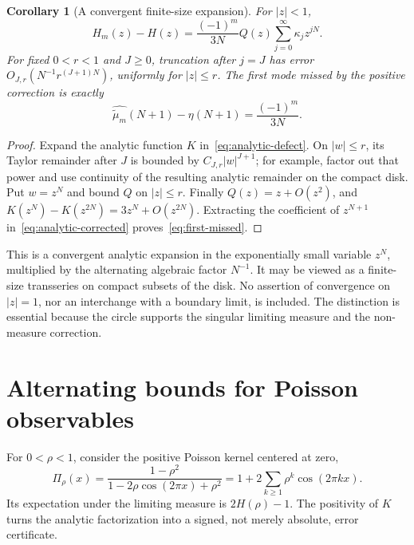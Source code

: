 \documentclass[11pt,a4paper]{article}
\numberwithin{equation}{section}
\newtheorem{corollary}[theorem]{Corollary}
\theoremstyle{definition}
\theoremstyle{remark}
\newcommand{\mt}{\widetilde\mu}
\begin{document}
\begin{corollary}[A convergent finite-size expansion]
\label{cor:transseries}
For $|z|<1$,
\begin{equation}
 H_m(z)-H(z)
 =\frac{(-1)^m}{3N}Q(z)
       \sum_{j=0}^{\infty}\kappa_jz^{jN}.
 \label{eq:lacunary-expansion}
\end{equation}
For fixed $0<r<1$ and $J\ge0$, truncation after $j=J$ has error
$O_{J,r}(N^{-1}r^{(J+1)N})$, uniformly for $|z|\le r$.
The first mode missed by the positive correction is exactly
\begin{equation}
 \widehat{\mt_m}(N+1)-\eta(N+1)=\frac{(-1)^m}{3N}.
 \label{eq:first-missed}
\end{equation}
\end{corollary}
\begin{proof}
Expand the analytic function $K$ in~\eqref{eq:analytic-defect}. On $|w|\le r$,
its Taylor remainder after $J$ is bounded by $C_{J,r}|w|^{J+1}$; for example,
factor out that power and use continuity of the resulting analytic remainder
on the compact disk. Put $w=z^N$ and bound $Q$ on $|z|\le r$.
Finally $Q(z)=z+O(z^2)$, and
$K(z^N)-K(z^{2N})=3z^N+O(z^{2N})$. Extracting the coefficient of $z^{N+1}$
in~\eqref{eq:analytic-corrected} proves~\eqref{eq:first-missed}.
\end{proof}

This is a convergent analytic expansion in the exponentially small variable
$z^N$, multiplied by the alternating algebraic factor $N^{-1}$. It may be
viewed as a finite-size transseries on compact subsets of the disk. No assertion
of convergence on $|z|=1$, nor an interchange with a boundary limit, is included.
The distinction is essential because the circle supports the singular limiting
measure and the non-measure correction.

\section{Alternating bounds for Poisson observables}
\label{sec:poisson}

For $0<\rho<1$, consider the positive Poisson kernel centered at zero,
\begin{equation}
 \Pi_\rho(x)=\frac{1-\rho^2}{1-2\rho\cos(2\pi x)+\rho^2}
 =1+2\sum_{k\ge1}\rho^k\cos(2\pi kx).
 \label{eq:poisson}
\end{equation}
Its expectation under the limiting measure is $2H(\rho)-1$. The positivity
of $K$ turns the analytic factorization into a signed, not merely absolute,
error certificate.
\end{document}
